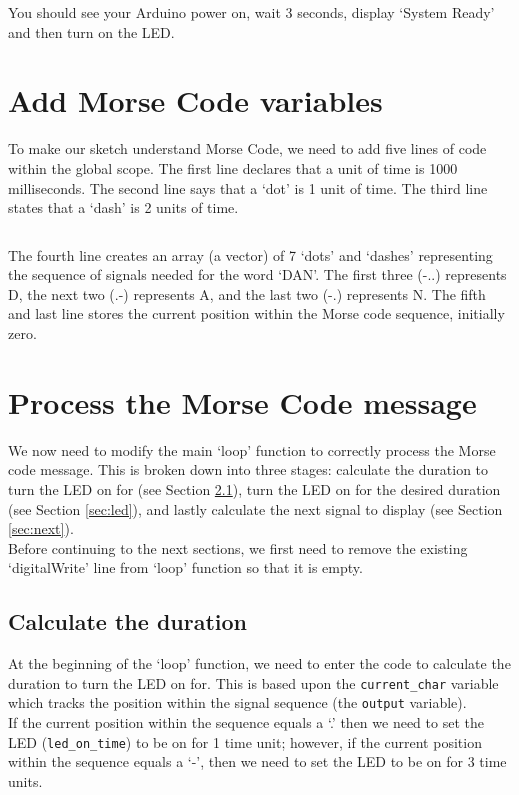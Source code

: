 \documentclass[11pt,a4paper]{article}
\begin{document}
\noindent
You should see your Arduino power on, wait 3 seconds, display `System Ready' and then turn on the LED.

\section{Add Morse Code variables}
To make our sketch understand Morse Code, we need to add five lines of code within the global scope. The first line declares that a unit of time is 1000 milliseconds. The second line says that a `dot' is 1 unit of time. The third line states that a `dash' is 2 units of time.\\ 

\inputminted{arduino}{./src/2-morse-code-variables.txt}

\noindent
The fourth line creates an array (a vector) of 7 `dots' and `dashes' representing the sequence of signals needed for the word `DAN'. The first three (-..) represents D, the next two (.-) represents A, and the last two (-.) represents N. The fifth and last line stores the current position within the Morse code sequence, initially zero.

\section{Process the Morse Code message}
We now need to modify the main `loop' function to correctly process the Morse code message. This is broken down into three stages: calculate the duration to turn the LED on for (see Section \ref{sec:duration}), turn the LED on for the desired duration (see Section \ref{sec:led}), and lastly calculate the next signal to display (see Section \ref{sec:next}).\\

\noindent
Before continuing to the next sections, we first need to remove the existing `digitalWrite' line from `loop' function so that it is empty.

\subsection{Calculate the duration}
\label{sec:duration}
At the beginning of the `loop' function, we need to enter the code to calculate the duration to turn the LED on for. This is based upon the \verb|current_char| variable which tracks the position within the signal sequence (the \verb|output| variable).\\

\noindent
If the current position within the sequence equals a `.' then we need to set the LED (\verb|led_on_time|) to be on for 1 time unit; however, if the current position within the sequence equals a `-', then we need to set the LED to be on for 3 time units.
\end{document}
